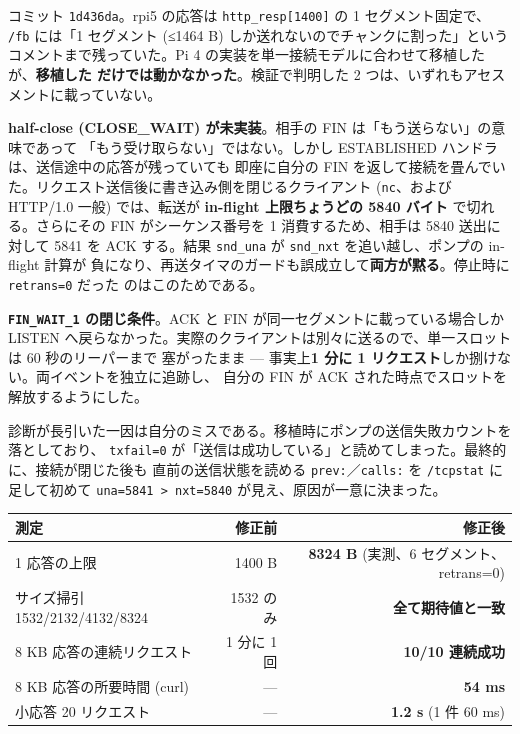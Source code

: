 \documentclass[a4paper,11pt]{ltjsarticle}
\begin{document}
コミット \texttt{1d436da}。rpi5 の応答は \texttt{http\_resp[1400]} の 1 セグメント固定で、
\texttt{/fb} には「1 セグメント (≤1464 B) しか送れないのでチャンクに割った」という
コメントまで残っていた。Pi 4 の実装を単一接続モデルに合わせて移植したが、\textbf{移植した
だけでは動かなかった}。検証で判明した 2 つは、いずれもアセスメントに載っていない。

\textbf{half-close (CLOSE\_WAIT) が未実装}。相手の FIN は「もう送らない」の意味であって
「もう受け取らない」ではない。しかし ESTABLISHED ハンドラは、送信途中の応答が残っていても
即座に自分の FIN を返して接続を畳んでいた。リクエスト送信後に書き込み側を閉じるクライアント
(\texttt{nc}、および HTTP/1.0 一般) では、転送が \textbf{in-flight 上限ちょうどの 5840 バイト}
で切れる。さらにその FIN がシーケンス番号を 1 消費するため、相手は 5840 送出に対して 5841 を
ACK する。結果 \texttt{snd\_una} が \texttt{snd\_nxt} を追い越し、ポンプの in-flight 計算が
負になり、再送タイマのガードも誤成立して\textbf{両方が黙る}。停止時に \texttt{retrans=0} だった
のはこのためである。

\textbf{\texttt{FIN\_WAIT\_1} の閉じ条件}。ACK と FIN が同一セグメントに載っている場合しか
LISTEN へ戻らなかった。実際のクライアントは別々に送るので、単一スロットは 60 秒のリーパーまで
塞がったまま --- 事実上\textbf{1 分に 1 リクエスト}しか捌けない。両イベントを独立に追跡し、
自分の FIN が ACK された時点でスロットを解放するようにした。

診断が長引いた一因は自分のミスである。移植時にポンプの送信失敗カウントを落としており、
\texttt{txfail=0} が「送信は成功している」と読めてしまった。最終的に、接続が閉じた後も
直前の送信状態を読める \texttt{prev:}／\texttt{calls:} を \texttt{/tcpstat} に足して初めて
\texttt{una=5841 > nxt=5840} が見え、原因が一意に決まった。

\begin{center}\small
\begin{longtable}{@{}l r r@{}}
\toprule
\textbf{測定} & \textbf{修正前} & \textbf{修正後}\\ \midrule
\endhead
1 応答の上限                          & 1400 B          & \textbf{8324 B} (実測、6 セグメント、retrans=0)\\
サイズ掃引 1532/2132/4132/8324        & 1532 のみ       & \textbf{全て期待値と一致}\\
8 KB 応答の連続リクエスト             & 1 分に 1 回     & \textbf{10/10 連続成功}\\
8 KB 応答の所要時間 (curl)            & ---             & \textbf{54 ms}\\
小応答 20 リクエスト                  & ---             & \textbf{1.2 s} (1 件 60 ms)\\
\bottomrule
\end{longtable}
\end{center}
\end{document}
